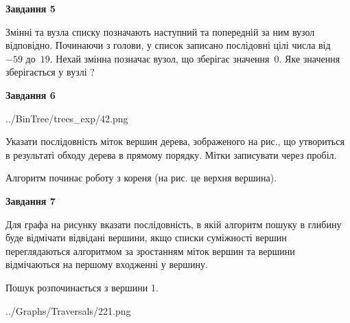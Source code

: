 \documentclass[12pt, ukrainian]{article}
\begin{document}
{\begin {large}
{\begin {center}\textbf{Завдання 5}\end {center}}\par
Змінні  та  вузла списку позначають наступний та попередній за ним вузол відповідно. Починаючи з голови, у список записано послідовні цілі числа від~$-59$ до~$19$. Нехай змінна  позначає вузол, що зберігає значення~$0$.
Яке значення зберігається у вузлі  ?\par
\newpage

{\begin {center}\textbf{Завдання 6}\end {center}}\par

\begin{center}
	{../BinTree/trees_exp/42.png}
\end{center}
Указати послідовність міток вершин дерева, зображеного на рис., що утвориться в результаті обходу дерева в прямому порядку. Мітки записувати через пробіл.\par Алгоритм починає роботу з кореня (на рис. це верхня вершина).\par
\newpage

{\begin {center}\textbf{Завдання 7}\end {center}}\par
Для графа на рисунку вказати послідовність, в якій алгоритм пошуку в глибину буде відмічати відвідані вершини, якщо списки суміжності вершин переглядаються алгоритмом за зростанням міток вершин та вершини відмічаються на першому вход\-женні у вершину.\par
Пошук розпочинається з вершини 1.\par

\begin{center}
	{../Graphs/Traversals/221.png}
\end{center}\par
\newpage


\end{large}}
\end{document}
